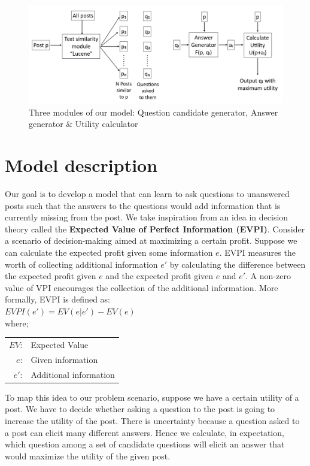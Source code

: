 \documentclass[11pt]{article}
\begin{document}
\begin{figure}[!t]
\centering
\includegraphics[scale=0.40]{model}
\caption{Three modules of our model: Question candidate generator, Answer generator \& Utility calculator}
\label{model}
\end{figure}

\section{Model description}\label{model}

Our goal is to develop a model that can learn to ask questions to unanswered posts such that the answers to the questions would add information that is currently missing from the post. We take inspiration from an idea in decision theory called the \textbf{Expected Value of Perfect Information (EVPI)}. Consider a scenario of decision-making aimed at maximizing a certain profit. Suppose we can calculate the expected profit given some information $e$. EVPI measures the worth of collecting additional information $e'$ by calculating the difference between the expected profit given $e$ and the expected profit given $e$ and $e'$. A non-zero value of VPI encourages the collection of the additional information. More formally, EVPI is defined as:\\

$EVPI(e') = EV(e| e') - EV(e)$ \\
where;
\begin{center}
\begin{tabular} {r  l}
$EV$: & Expected Value \\
$e$: & Given information \\
$e'$: & Additional information \\
\end{tabular}
\end{center}

To map this idea to our problem scenario, suppose we have a certain utility of a post. We have to decide whether asking a question to the post is going to increase the utility of the post. There is uncertainty because a question asked to a post can elicit many different answers. Hence we calculate, in expectation, which question among a set of candidate questions will elicit an answer that would maximize the utility of the given post. 
\end{document}
